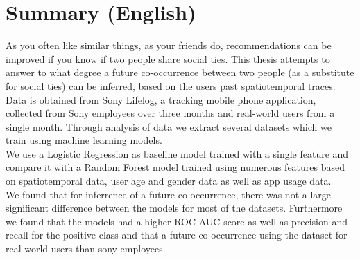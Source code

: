 \chapter{Summary (English)}
As you often like similar things, as your friends do, recommendations can be improved if you know if two people share social ties.
This thesis attempts to answer to what degree a future co-occurrence between two people (as a substitute for social ties) can be inferred, based on the users past spatiotemporal traces. 
Data is obtained from Sony Lifelog, a tracking mobile phone application, collected from Sony employees over three months and real-world users from a single month.
Through analysis of data we extract several datasets which we train using machine learning models.\\
We use a Logistic Regression as baseline model trained with a single feature and compare it with a Random Forest model trained using numerous features based on spatiotemporal data, user age and gender data as well as app usage data. \\
We found that for inferrence of a future co-occurrence, there was not a large significant difference between the models for most of the datasets. Furthermore we found that the models had a higher ROC AUC score as well as precision and recall for the positive class and that a future co-occurrence using the dataset for real-world users than sony employees.